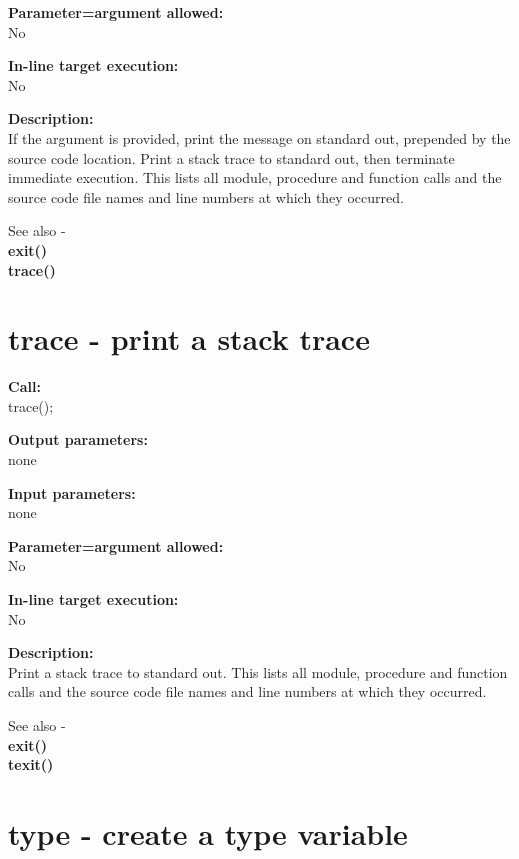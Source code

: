         {\bf Parameter=argument allowed:} \\
        No
        
        {\bf In-line target execution:} \\
        No
        
        {\bf Description:} \\
	If the argument is provided, print the message on standard out,
	prepended by the source code location.
        Print a stack trace to standard out, then terminate immediate execution.
        This lists all module, procedure and function calls and the source code
        file names and line numbers at which they occurred.
        
        See also - \\
        {\bf exit()}  \\
        {\bf trace()} 



    \section{trace - print a stack trace}\label{sec:iptrace}
        
        {\bf Call:} \\
        trace();
        
        {\bf Output parameters:} \\
        none
        
        {\bf Input parameters:} \\
        none
        
        {\bf Parameter=argument allowed:} \\
        No
        
        {\bf In-line target execution:} \\
        No
        
        {\bf Description:} \\
        Print a stack trace to standard out. This lists all module, procedure
        and function calls and the source code file names and line numbers at
        which they occurred.
        
        See also - \\
        {\bf exit()}  \\
        {\bf texit()} 


    \section{type - create a type variable}\label{sec:iptype}
        
